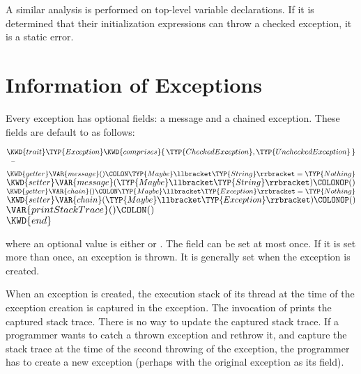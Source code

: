 A similar analysis is performed on top-level variable declarations.
If it is determined that their initialization expressions
can throw a checked exception, it is a static error.

\section{Information of Exceptions}

Every exception has optional fields: a message and a chained exception.
These fields are default to  as follows:
\begin{Fortress}
\(\KWD{trait} \TYP{Exception} \KWD{comprises} \{\,\TYP{CheckedException}, \TYP{UncheckedException}\,\}\)\\
{\tt~~}\pushtabs\=\+\(  \KWD{getter} \VAR{message}()\COLON \TYP{Maybe}\llbracket\TYP{String}\rrbracket = \TYP{Nothing}\)\\
\(  \KWD{setter} \VAR{message}(\TYP{Maybe}\llbracket\TYP{String}\rrbracket)\COLONOP()\)\\
\(  \KWD{getter} \VAR{chain}()\COLON \TYP{Maybe}\llbracket\TYP{Exception}\rrbracket = \TYP{Nothing}\)\\
\(  \KWD{setter} \VAR{chain}(\TYP{Maybe}\llbracket\TYP{Exception}\rrbracket)\COLONOP()\)\\
\(  \VAR{printStackTrace}()\COLON ()\)\-\\\poptabs
\(\KWD{end}\)
\end{Fortress}
where an optional value  is either  or
.
The  field can be set at most once.  If it is set more than
once, an  exception is thrown.
It is generally set when the exception is created.


When an exception is created, the execution stack of its thread at the time
of the exception creation is captured in the exception.  The invocation of
 prints the captured stack trace.
There is no way to update the captured stack trace.
If a programmer wants to catch a thrown exception and rethrow it, and
capture the stack trace at the time of the second throwing of the
exception, the programmer has to create a new exception (perhaps with the
original exception as its  field).

